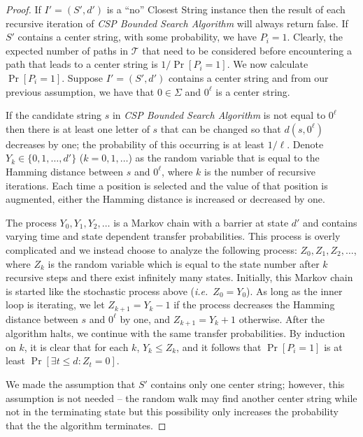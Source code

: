\begin{proof} If $I' = (S', d')$ is a ``no'' {\sc Closest String} instance then the result of each recursive iteration of {\em CSP Bounded Search Algorithm} will always return false. If $S'$ contains a center string, with some probability, we have $P_i = 1$.  Clearly, the expected number of paths in $\mathcal{T}$ that need to be considered before encountering a path that leads to a center string is $1/\Pr[P_i = 1]$.  We now calculate $\Pr[P_i = 1]$.  Suppose $I' = (S', d')$ contains a center string and from our previous assumption, we have that $0 \in \Sigma$ and $0^{\ell}$ is a center string. 

If the candidate string $s$ in {\em CSP Bounded Search Algorithm} is not equal to $0^{\ell}$ then there is at least one letter of $s$ that can be changed so that $d(s, 0^{\ell})$ decreases by one; the probability of this occurring is at least $1/\ell$.  Denote $Y_k \in \{0, 1, \ldots, d'\}$ ($k = 0, 1, \ldots$) as the random variable that is equal to the Hamming distance between $s$ and $0^{\ell}$, where $k$ is the number of recursive iterations.  Each time a position is selected and the value of that position is augmented, either the Hamming distance is increased or decreased by one.

The process $Y_0, Y_1, Y_2, \ldots$ is a Markov chain with a barrier at state $d'$ and contains varying time and state dependent transfer probabilities. This process is overly complicated and we instead choose to analyze the following process: $Z_0, Z_1, Z_2, \ldots$,  where $Z_k$ is the random variable which is equal to the state number after $k$ recursive steps and there exist infinitely many states.  Initially, this Markov chain is started like the stochastic process above ({\em i.e.}\ $Z_0 = Y_0$).  As long as the inner loop is iterating, we let $Z_{k+1} = Y_k - 1$  if the process decreases the Hamming distance between $s$ and $0^{\ell}$ by one, and $Z_{k+1} = Y_k + 1$ otherwise.  After the algorithm halts, we continue with the same transfer probabilities. By induction on $k$, it is clear that for each $k$, $Y_k \leq Z_k$, and it follows that $\Pr[P_i = 1]$ is at least $\Pr[\exists t \leq d: Z_t = 0]$.    

We made the assumption that $S'$ contains only one center string; however, this assumption is not needed -- the random walk may find another center string while not in the terminating state but this possibility only increases the probability that the the algorithm terminates. 


\end{proof}
